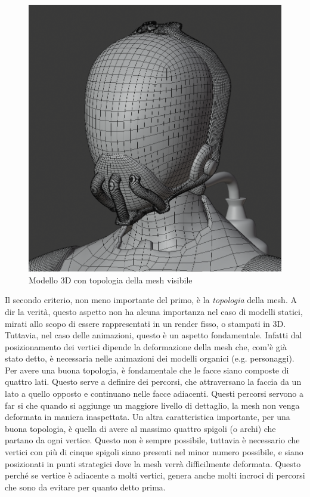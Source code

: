 \begin{figure}
\centering
\includegraphics[width=.8\textwidth]{Figures/bandit-wire}
\decoRule
\caption[Topologia]{Modello 3D con topologia della mesh visibile}
\label{fig:wire}
\end{figure}
Il secondo criterio, non meno importante del primo, è la \emph{topologia} della mesh.
A dir la verità, questo aspetto non ha alcuna importanza nel caso di modelli statici, mirati allo scopo di essere rappresentati in un render fisso, o stampati in 3D.
Tuttavia, nel caso delle animazioni, questo è un aspetto fondamentale.
Infatti dal posizionamento dei vertici dipende la deformazione della mesh che, com'è già stato detto, è necessaria nelle animazioni dei modelli organici (e.g. personaggi).
Per avere una buona topologia, è fondamentale che le facce siano composte di quattro lati. Questo serve a definire dei percorsi, che attraversano la faccia da un lato a quello opposto e continuano nelle facce adiacenti.
Questi percorsi servono a far si che quando si aggiunge un maggiore livello di dettaglio, la mesh non venga deformata in maniera inaspettata.
Un altra caratteristica importante, per una buona topologia, è quella di avere al massimo quattro spigoli (o archi) che partano da ogni vertice.
Questo non è sempre possibile, tuttavia è necessario che vertici con più di cinque spigoli siano presenti nel minor numero possibile, e siano posizionati in punti strategici dove la mesh verrà difficilmente deformata.
Questo perché se vertice è adiacente a molti vertici, genera anche molti incroci di percorsi che sono da evitare per quanto detto prima.

